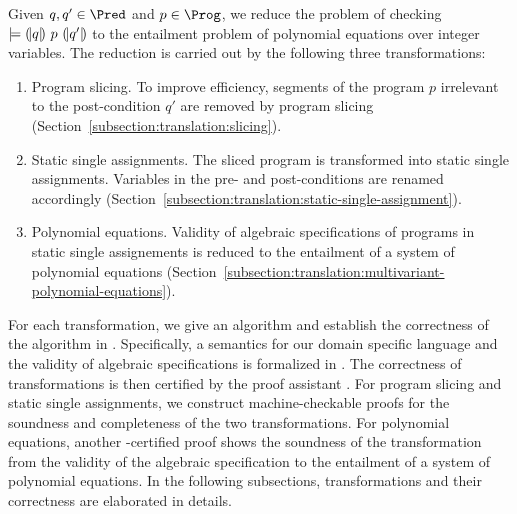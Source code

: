 
Given $q, q' \in \Pred$ and $p \in \Prog$, we reduce the problem of checking
$\models {(\!|}{q}{|\!)}~{p}~{(\!|}{q'}{|\!)}$ to the entailment problem of
polynomial equations over integer variables. The reduction is carried out by
the following three transformations:
\begin{enumerate}
\item Program slicing. To improve efficiency, segments of the program $p$
  irrelevant to the post-condition $q'$ are removed by program slicing 
  (Section~\ref{subsection:translation:slicing}). 
\item Static single assignments. The sliced program is transformed
  into static single assignments. Variables in the pre- and
  post-conditions are renamed accordingly
  (Section~\ref{subsection:translation:static-single-assignment}).
\item Polynomial equations. Validity of algebraic specifications of
  programs in static single assignements is reduced to the entailment
  of a system of polynomial equations
  (Section~\ref{subsection:translation:multivariant-polynomial-equations}). 
\end{enumerate}

For each transformation, we give an algorithm and establish the
correctness of the algorithm in \coq. Specifically, a semantics
for our domain specific language and the validity of algebraic
specifications is formalized in \coq. The correctness of
transformations is then certified by the proof assistant \coq.
For program slicing and static single assignments, we
construct machine-checkable proofs for the soundness and completeness
of the two transformations. For polynomial equations, another
\coq-certified proof shows the soundness of the transformation
from the validity of the algebraic specification to the entailment of 
a system of polynomial equations. In the following subsections,
transformations and their correctness are elaborated in details.  